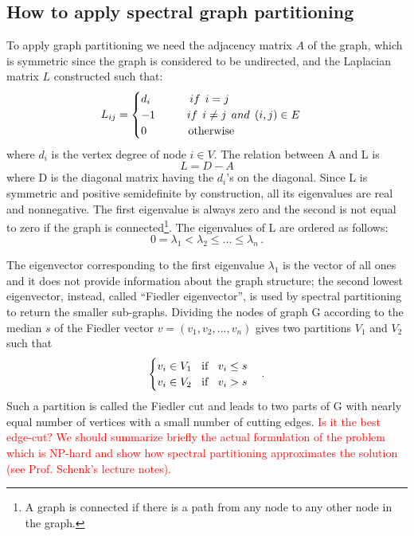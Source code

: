 \documentclass[]{usiinfbachelorproject}
\newcommand\tab[1][1cm]{\hspace*{#1}}
\begin{document}
\subsection{How to apply spectral graph partitioning}
To apply graph partitioning we need the adjacency matrix $A$ of the graph, which is symmetric since the graph is considered to be undirected, and the Laplacian matrix $L$ constructed such that: 
\begin{equation}\notag
L_{ij} = 
\begin{cases}
d_i \tab \:\:\: if \:\: i=j \\
-1 \tab if \:\: i \neq j \:\: and \: \: (i,j) \in E \\
0 \tab \:\:\:\: \text{otherwise}
\end{cases}
\end{equation}
where $d_i$ is the vertex degree of node $i \in V$.
The relation between A and L is
\begin{equation}
L = D - A
\end{equation}
where D is the diagonal matrix having the $d_i$'s on the diagonal. Since L is symmetric and positive semidefinite by construction, all its eigenvalues are real and nonnegative. The first eigenvalue is always zero and the second is not equal to zero if the graph is connected\footnote{A graph is connected if there is a path from any node to any other node in the graph.}.
The eigenvalues of L are ordered as follows:
\begin{equation}
0 = \lambda_1 < \lambda_2 \leq ... \leq \lambda_n \,.
\end{equation}

The eigenvector corresponding to the first eigenvalue $\lambda_1$ is the vector of all ones and it does not provide information about the graph structure; the second lowest eigenvector, instead, called ``Fiedler eigenvector'', is used by spectral partitioning to return the smaller sub-graphs. Dividing the nodes of graph G according to the median $s$ of the Fiedler vector $v = (v_1,v_2,...,v_n)$ gives two partitions $V_1$ and $V_2$ such that
\begin{equation}\notag
\begin{cases}
v_i \in V_1 \text{\;\; if \;\;} v_i \leq s \\
v_i \in V_2 \text{\;\; if \;\;} v_i > s
\end{cases} .
\end{equation}
Such a partition is called the Fiedler cut and leads to two parts of G with nearly equal number of vertices with a small number of cutting edges. \textcolor{red}{Is it the best edge-cut? We should summarize briefly the actual formulation of the problem which is NP-hard and show how spectral partitioning approximates the solution (see Prof. Schenk's lecture notes).}
\end{document}
